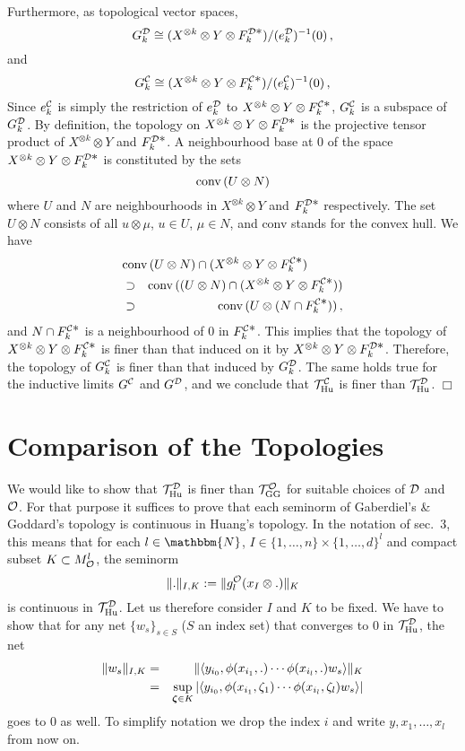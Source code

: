 \documentclass[a4paper,12pt,twoside]{article}
\renewcommand{\b}{\langle}
\renewcommand{\k}{\rangle}
\renewcommand{\v}[1]{\mbox{\boldmath $#1$}}
\renewcommand{\c}[1]{{\cal #1}}
\newcommand{\bN}{\mathbbm{N}}
\newcommand{\conv}{{\rm conv\,}}
\newcommand{\cT}{{\cal T}}
\newcommand{\qed}{\hspace{2em}$\Box$\vspace{1em}}
\renewcommand{\O}{\c{O}}
\newcommand{\C}{\c{C}}
\newcommand{\D}{\c{D}}
\renewcommand{\S}{\c{S}}
\newcommand{\Hu}{{\rm Hu}}
\newcommand{\GG}{{\rm GG}}
\newcommand{\THuc}{\cT_{\Hu}^{\C}}
\newcommand{\THud}{\cT_{\Hu}^{\D}}
\newcommand{\TGG}{\cT_{\GG}^{\O}}
\newcommand{\Fcd}{F^{\C{\textstyle *}}_k}
\newcommand{\Fdd}{F^{\D{\textstyle *}}_k}
\newcommand{\Mo}{M^l_{\O}}
\newcommand{\go}{g_l^{\O}}
\newcommand{\ec}{e_k^{\C}}
\newcommand{\ed}{e_k^{\D}}
\newcommand{\Gck}{G^{\C}_k}
\newcommand{\Gdk}{G^{\D}_k}
\newcommand{\Gc}{G^{\C}}
\newcommand{\Gd}{G^{\D}}
\renewcommand{\S}{\scriptstyle}
\begin{document}
Furthermore, as topological vector spaces,
$$\Gdk \cong
(X^{\otimes k}\otimes Y\otimes\Fdd)/(\ed)^{-1}(0)\,,$$
and
$$\Gck \cong
(X^{\otimes k}\otimes Y\otimes\Fcd)/(\ec)^{-1}(0)\,,$$
Since $\ec$ is simply the restriction of $\ed$ to
$X^{\otimes k}\otimes Y\otimes\Fcd$, $\Gck$ is a subspace of $\Gdk$.
By definition, the topology on $X^{\otimes k}\otimes Y\otimes\Fdd$
is the projective tensor product of
$X^{\otimes k}\otimes Y$ and $\Fdd$.
A neighbourhood base at 0
of the space $X^{\otimes k}\otimes Y \otimes \Fdd$
is constituted by the sets
$$\conv(U\otimes N)$$
where $U$ and $N$ are neighbourhoods in
$X^{\otimes k}\otimes Y$ and $\Fdd$ respectively.
The set $U\otimes N$ consists
of all $u\otimes\mu$, $u\in U$, $\mu\in N$, and
conv stands for the convex hull. We have
\begin{eqnarray*}
\lefteqn{\conv(U\otimes N)\cap(X^{\otimes k}\otimes Y\otimes\Fcd)} \\
&\supset&\conv((U\otimes N)\cap(X^{\otimes k}\otimes Y\otimes\Fcd)) \\
&\supset&\conv(U\otimes (N\cap\Fcd))\,,
\end{eqnarray*}
and $N\cap\Fcd$ is a neighbourhood of 0 in $\Fcd$.
This implies that the topology of
$X^{\otimes k}\otimes Y\otimes\Fcd$ is finer than that induced
on it by $X^{\otimes k}\otimes Y\otimes\Fdd$. Therefore, the topology of
$\Gck$ is finer than that induced by $\Gdk$.
The same holds true
for the inductive limits $\Gc$ and $\Gd$, and we conclude that $\THuc$ is finer than
$\THud$.
\qed
\section{Comparison of the Topologies}
\label{Comparison_of_the_Topologies}
We would like to show that $\THud$ is finer than $\TGG$
for suitable choices of $\cal D$ and $\cal O$. For that purpose it
suffices to prove that each seminorm of Gaberdiel's \& Goddard's topology
is continuous in Huang's topology. In the notation of sec.\ 3, this means that for each
$l\in\bN$, $I\in\{1,\ldots,n\}\times\{1,\ldots,d\}^l$ and compact subset $K\subset\Mo$,
the seminorm
$$\|.\|_{I,K} := \|\go(x_I\otimes .)\|_K$$
is continuous in $\THud$. Let us therefore consider $I$ and $K$ to be fixed.
We have to show that for any net $\{w_s\}_{s\in S}$ ($S$ an index set)
that converges to 0 in $\THud$, the net
\begin{eqnarray}
\|w_s\|_{I,K} & = & \|\b y_{i_0},\phi(x_{i_1},.)\cdots
\phi(x_{i_l},.)w_s\k\|_K \nonumber \\
& = & \sup_{\v{\S\zeta}\in K} |\b y_{i_0},\phi(x_{i_1},\zeta_1)\cdots
\phi(x_{i_l},\zeta_l)w_s\k| \label{fixedIK}
\end{eqnarray}
goes to 0 as well. To simplify notation we drop the index $i$
and write $y, x_1,\ldots,x_l$ from now on.
\end{document}
